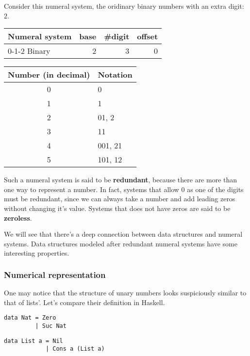 \documentclass[12pt, a4paper]{article}
\begin{document}
Consider this numeral system, the oridinary binary numbers with an extra digit:
$ 2 $.

\begin{center}
    \begin{tabular}{l*{3}{r}}
    Numeral system      & base  & \#digit    & offset    \\
    \hline
    0-1-2 Binary        & 2     & 3          & 0         \\
    \end{tabular}
\end{center}

\begin{center}
    \begin{tabular}{c*{1}{l}}
    Number (in decimal)  & Notation \\
    \hline
    0       & 0 \\
    1       & 1 \\
    2       & 01, 2 \\
    3       & 11 \\
    4       & 001, 21 \\
    5       & 101, 12 \\
    \end{tabular}
\end{center}

Such a numeral system is said to be \textbf{redundant}, because there are more than one
way to represent a number. In fact, systems that allow $ 0 $ as one of the digits
must be redundant, since we can always take a number and add leading zeros without
changing it's value. Systems that does not have zeros are said to be \textbf{zeroless}.

We will see that there's a deep connection between data
structures and  numeral systems. Data structures modeled after redundant numeral
systems have some interesting properties.

\subsubsection{Numerical representation}

One may notice that the structure of unary numbers looks suspiciously similar
to that of lists'. Let's compare their definition in Haskell.

\noindent\begin{minipage}{.45\textwidth}
\begin{lstlisting}
data Nat = Zero
         | Suc Nat
\end{lstlisting}
\end{minipage}\hfill
\begin{minipage}{.48\textwidth}
\begin{lstlisting}
data List a = Nil
            | Cons a (List a)
\end{lstlisting}
\end{minipage}
\end{document}
